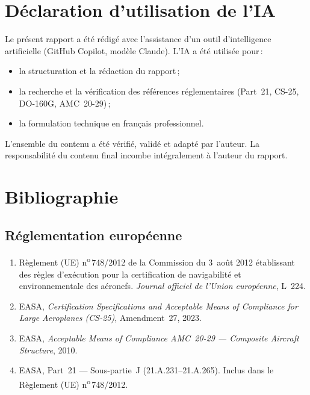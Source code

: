 \documentclass[12pt,a4paper]{article}
\begin{document}
\section{Déclaration d'utilisation de l'IA}

Le présent rapport a été rédigé avec l'assistance d'un outil d'intelligence artificielle (GitHub Copilot, modèle Claude). L'IA a été utilisée pour\,:

\begin{itemize}[nosep]
    \item la structuration et la rédaction du rapport\,;
    \item la recherche et la vérification des références réglementaires (Part~21, CS-25, DO-160G, AMC~20-29)\,;
    \item la formulation technique en français professionnel.
\end{itemize}

L'ensemble du contenu a été vérifié, validé et adapté par l'auteur. La responsabilité du contenu final incombe intégralement à l'auteur du rapport.

\section{Bibliographie}

\subsection*{Réglementation européenne}

\begin{enumerate}[nosep]
    \item Règlement (UE) n\textsuperscript{o}\,748/2012 de la Commission du 3~août 2012 établissant des règles d'exécution pour la certification de navigabilité et environnementale des aéronefs. \textit{Journal officiel de l'Union européenne}, L~224.
    \item EASA, \textit{Certification Specifications and Acceptable Means of Compliance for Large Aeroplanes (CS-25)}, Amendment~27, 2023.
    \item EASA, \textit{Acceptable Means of Compliance AMC~20-29 --- Composite Aircraft Structure}, 2010.
    \item EASA, Part~21 --- Sous-partie~J (21.A.231--21.A.265). Inclus dans le Règlement (UE) n\textsuperscript{o}\,748/2012.
\end{enumerate}
\end{document}
